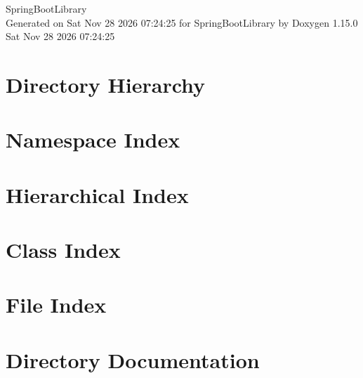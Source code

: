 \documentclass[twoside]{book}
\newcommand{\+}{\discretionary{\mbox{\scriptsize$\hookleftarrow$}}{}{}}
\newcommand{\clearemptydoublepage}{%
    \newpage{\pagestyle{empty}\cleardoublepage}%
  }
\begin{document}
  \raggedbottom
    \hypersetup{pageanchor=false,
                bookmarksnumbered=true,
                pdfencoding=unicode
               }
  \begin{titlepage}
  \vspace*{7cm}
  \begin{center}%
  {\Large Spring\+Boot\+Library}\\
  \vspace*{1cm}
  {\large Generated on Sat Nov 28 2026 07\+:24\+:25 for Spring\+Boot\+Library by Doxygen 1.15.0}\\
    \vspace*{0.5cm}
    {\small Sat Nov 28 2026 07:24:25}
  \end{center}
  \end{titlepage}
  \clearemptydoublepage
  \tableofcontents
  \clearemptydoublepage
  \hypersetup{pageanchor=true}
\chapter{Directory Hierarchy}

\chapter{Namespace Index}

\chapter{Hierarchical Index}

\chapter{Class Index}

\chapter{File Index}

\chapter{Directory Documentation}



















\end{document}
